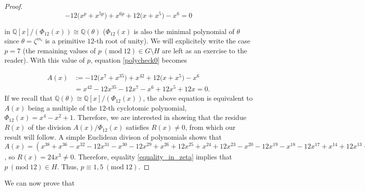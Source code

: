 \documentclass[a4paper, 12pt]{article}
\theoremstyle{definition}
\theoremstyle{remark}
\newcommand{\Q}{\ensuremath{\mathbb{Q}}}
\newcommand{\Mod}[1]{\ (\mathrm{mod}\ #1)} %
\begin{document}
\begin{proof}
\begin{equation}\label{polycheck0}
-12\big(x^p+x^{5p}\big)+x^{6p}+12\big(x+x^{5}\big)-x^{6}=0
\end{equation}

in $\Q[x]/(\Phi_{12}(x))\cong\Q(\theta)$ ($\Phi_{12}(x)$ is also the minimal polynomial of $\theta$ since $\theta=\zeta^{m_i}$ is a primitive $12$-th root of unity). We will explicitely write the case $p=7$ (the remaining values of $p \Mod{12}\in G\setminus H$ are left as an exercise to the reader). With this value of $p$, equation \eqref{polycheck0} becomes

\begin{align*}
A(x)&:=-12\big(x^{7}+x^{35}\big)+x^{42}+12\big(x+x^{5}\big)-x^{6}\\
&=x^{42} - 12 x^{35} - 12 x^{7} - x^{6} + 12 x^{5} + 12 x=0.
\end{align*}
If we recall that $\Q(\theta)\cong\Q[x]/(\Phi_{12}(x))$, the above equation is equivalent to $A(x)$ being a multiple of the $12$-th cyclotomic polynomial, $\Phi_{12}(x) = x^{4} - x^{2} + 1$. Therefore, we are interested in showing that the residue $R(x)$ of the division $A(x)/\Phi_{12}(x)$ satisfies $R(x)\neq 0$, from which our result will follow. A simple Euclidean divison of polynomials shows that $A(x)=(x^{38} + x^{36} - x^{32} - 12 x^{31} - x^{30} - 12 x^{29} + x^{26} + 12 x^{25} + x^{24} + 12 x^{23} - x^{20} - 12 x^{19} - x^{18} - 12 x^{17} + x^{14} + 12 x^{13} + x^{12} + 12 x^{11} - x^{8} - 12 x^{7} - x^{6} - 12 x^{5} - 12 x^{3} + 12 x)\cdot\Phi_{12}(x)+(24 x^{3})$, so $R(x)=24 x^{3} \neq 0$. Therefore, equality \eqref{equality_in_zeta} implies that $p \Mod{12} \in H$. Thus, $p\equiv 1,5\Mod{12}$.
\end{proof}

We can now prove that
\end{document}
